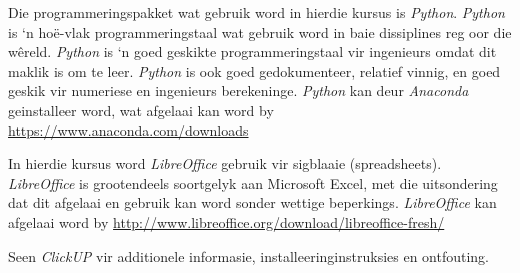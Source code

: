         Die programmeringspakket wat gebruik word in hierdie kursus is
        \textit{Python}.  \textit{Python} is `n ho\"{e}-vlak programmeringstaal
        wat gebruik word in baie dissiplines reg oor die w\^{e}reld.
        \textit{Python} is `n goed geskikte programmeringstaal vir ingenieurs
        omdat dit maklik is om te leer.  \textit{Python} is ook goed
        gedokumenteer, relatief vinnig, en goed geskik vir numeriese en
        ingenieurs berekeninge. \textit{Python} kan deur \textit{Anaconda}
        geinstalleer word, wat afgelaai kan word by
        \url{https://www.anaconda.com/downloads}

        In hierdie kursus word \textit{LibreOffice} gebruik vir sigblaaie
        (spreadsheets). \textit{LibreOffice} is grootendeels soortgelyk aan
        Microsoft Excel, met die uitsondering dat dit afgelaai en gebruik kan
        word sonder wettige beperkings. \textit{LibreOffice} kan afgelaai word
        by \url{http://www.libreoffice.org/download/libreoffice-fresh/}

        Seen \textit{ClickUP} vir additionele informasie,
        installeeringinstruksies en ontfouting.
